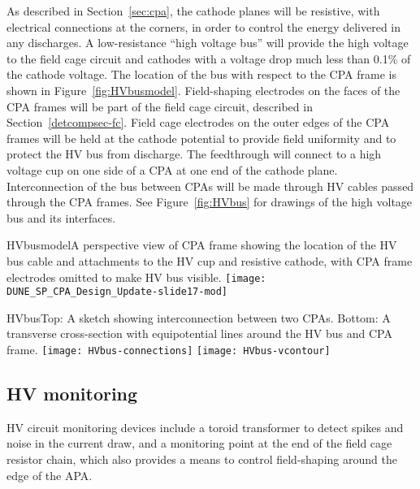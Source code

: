 As described in Section~\ref{sec:cpa}, the cathode planes will be
resistive, with electrical connections at the corners, in order to
control the energy delivered in any discharges.  A low-resistance
``high voltage bus'' will provide the high voltage to the field cage
circuit and cathodes with a voltage drop much less than 0.1\% of the
cathode voltage. The location of the bus with respect to the CPA frame is shown in Figure~\ref{fig:HVbusmodel}. Field-shaping electrodes on the faces of the CPA
frames will be part of the field cage circuit, described in Section~\ref{detcompsec-fc}. %
Field cage electrodes on the outer edges of the
CPA frames will be held at the cathode potential to provide field
uniformity and to protect the HV bus from discharge.  The feedthrough
will connect to a high voltage cup on one side of a CPA at one end of
the cathode plane.  Interconnection of the bus between CPAs will be made
through HV cables passed through the CPA frames.  See
Figure~\ref{fig:HVbus} for drawings of the high voltage bus and its
interfaces.

\begin{cdrfigure}{HVbusmodel}{A perspective view of CPA frame showing the location of the HV bus cable and attachments to the HV cup and resistive cathode, with CPA frame electrodes omitted to make HV bus visible.}
\texttt{[image: DUNE\_SP\_CPA\_Design\_Update-slide17-mod]}
\end{cdrfigure}

\begin{cdrfigure}{HVbus}{Top: A sketch showing interconnection between two CPAs. Bottom: A transverse cross-section with equipotential lines around the HV bus and CPA frame.}
\texttt{[image: HVbus-connections]}
\texttt{[image: HVbus-vcontour]}
\end{cdrfigure}


\subsection{HV monitoring}

HV circuit monitoring devices include a toroid transformer to detect
spikes and noise in the current draw, and a monitoring point at the end
of the field cage resistor chain, which also provides a means to
control field-shaping around the edge of the
APA.

